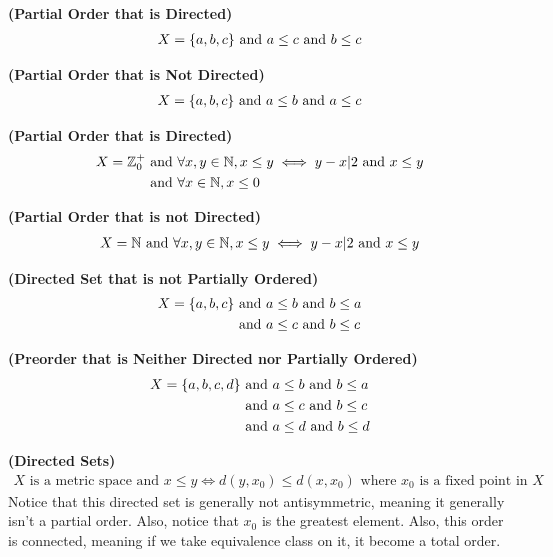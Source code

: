 \documentclass{report}
\begin{document}
\begin{mdframed}
\begin{Example}{\textbf{(Partial Order that is Directed)}}{}
\begin{align*}
X=\{ a,b,c \}\text{ and }a\leq c \text{ and } b \leq c
\end{align*}
\end{Example}
\begin{Example}{\textbf{(Partial Order that is Not Directed)}}{}
\begin{align*}
X=\{ a,b,c \}\text{ and }a\leq b\text{ and }a\leq c
\end{align*}
\end{Example}
\begin{Example}{\textbf{(Partial Order that is Directed)}}{}
\begin{align*}
  X=\mathbb{Z}^+_0&\text{ and }\forall x,y \in\mathbb{N}, x\leq y\iff y-x |2 \text{ and }x\leq y\\
&\text{ and }\forall x \in\mathbb{N}, x\leq 0
\end{align*}
\end{Example}
\begin{Example}{\textbf{(Partial Order that is not Directed)}}{}
\begin{align*}
X=\mathbb{N}\text{ and }\forall x,y\in\mathbb{N}, x\leq y\iff  y-x |2\text{ and }x\leq y
\end{align*}
\end{Example}
\begin{Example}{\textbf{(Directed Set that is not Partially Ordered)}}{}
\begin{align*}
  X=\{ a,b,c \}&\text{ and }a\leq b\text{ and }b\leq a\\
&\text{ and }a\leq c\text{ and }b\leq c
\end{align*}
\end{Example}
\begin{Example}{\textbf{(Preorder that is Neither Directed nor Partially Ordered)}}{}
\begin{align*}
  X=\{ a,b,c,d \}&\text{ and }a\leq b\text{ and }b\leq a\\
&\text{ and }a\leq c\text{ and }b\leq c\\
&\text{ and }a\leq d\text{ and }b\leq d
\end{align*}
\end{Example}
\begin{Example}{\textbf{(Directed Sets)}}{}
\begin{align*}
  X\text{ is a metric space and }x\leq y\iff  d(y,x_0)\leq  d(x,x_0) \text{ where $x_0$ is a fixed point in $X$ } 
\end{align*}
Notice that this directed set is generally not antisymmetric, meaning it generally isn't a partial order. Also, notice that $x_0$ is the greatest element. Also, this order is connected, meaning if we take equivalence class on it, it become a total order.\\


\end{Example}
\end{mdframed}
\end{document}
